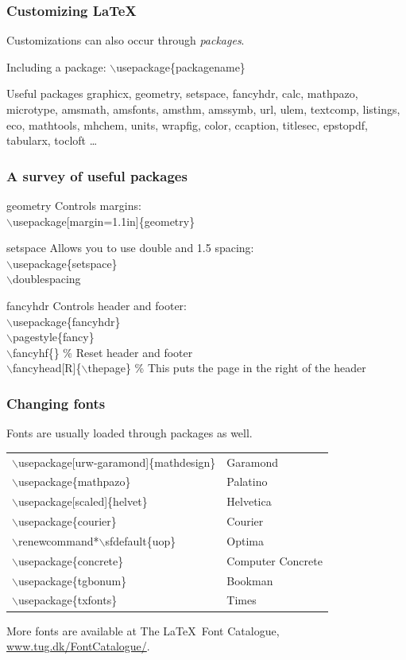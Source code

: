\documentclass[ignorenonframetext]{beamer}
\begin{document}
\begin{frame}
  \frametitle{Customizing \LaTeX}
  Customizations can also occur through \emph{packages}.
  \begin{block}{Including a package:}
    $\backslash$usepackage\{packagename\}
  \end{block}
  \begin{block}{Useful packages}
    graphicx, geometry, setspace, fancyhdr, calc, mathpazo, microtype,
    amsmath, amsfonts, amsthm, amssymb, url, ulem, textcomp, listings,
    eco, mathtools, mhchem, units, wrapfig, color, ccaption, titlesec,
    epstopdf, tabularx, tocloft \ldots
  \end{block}
\end{frame}

\begin{frame}
  \frametitle{A survey of useful packages}
  \begin{block}{geometry}
    Controls margins:\\
    \quad$\backslash$usepackage[margin=1.1in]\{geometry\}
  \end{block}
  \begin{block}{setspace}
    Allows you to use double and 1.5 spacing:\\
    \quad$\backslash$usepackage\{setspace\}\\
    \quad$\backslash$doublespacing
  \end{block}
  \begin{block}{fancyhdr}
    Controls header and footer:\\
    \small\quad$\backslash$usepackage\{fancyhdr\}\\
    \quad$\backslash$pagestyle\{fancy\}\\
    \quad$\backslash$fancyhf\{\} \% Reset header and footer\\
    \quad$\backslash$fancyhead[R]\{$\backslash$thepage\} \% This puts the page in the right of the header
  \end{block}
\end{frame}

\begin{frame}
  \frametitle{Changing fonts}
  Fonts are usually loaded through packages as well.
  \begin{tabular}{l l}
    $\backslash$usepackage[urw-garamond]\{mathdesign\} & Garamond\\
    $\backslash$usepackage\{mathpazo\} & Palatino\\
    $\backslash$usepackage[scaled]\{helvet\} & Helvetica\\
    $\backslash$usepackage\{courier\} & Courier\\
    $\backslash$renewcommand*$\backslash$sfdefault\{uop\} & Optima\\
    $\backslash$usepackage\{concrete\} & Computer Concrete\\
    $\backslash$usepackage\{tgbonum\} & Bookman\\
    $\backslash$usepackage\{txfonts\} & Times
  \end{tabular}

  More fonts are available at The \LaTeX\ Font Catalogue,
  \url{www.tug.dk/FontCatalogue/}.
\end{frame}
\end{document}

